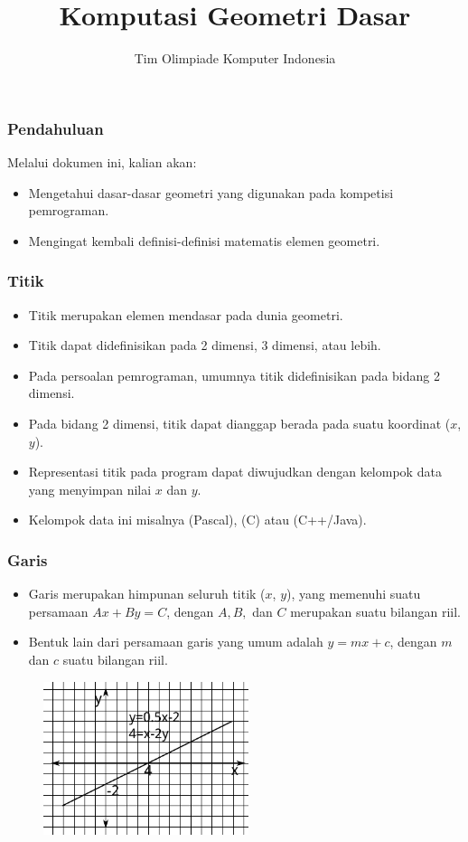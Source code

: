 

\title{Komputasi Geometri Dasar}
\author{Tim Olimpiade Komputer Indonesia}
\date{}



\begin{frame}
\titlepage
\end{frame}

\begin{frame}
\frametitle{Pendahuluan}
Melalui dokumen ini, kalian akan:
\begin{itemize}
  \item Mengetahui dasar-dasar geometri yang digunakan pada kompetisi pemrograman.
  \item Mengingat kembali definisi-definisi matematis elemen geometri.
\end{itemize}
\end{frame}

\begin{frame}
\frametitle{Titik}
\begin{itemize}
  \item Titik merupakan elemen mendasar pada dunia geometri.
  \item Titik dapat didefinisikan pada 2 dimensi, 3 dimensi, atau lebih.
  \item Pada persoalan pemrograman, umumnya titik didefinisikan pada bidang 2 dimensi.
  \item Pada bidang 2 dimensi, titik dapat dianggap berada pada suatu koordinat ($x$, $y$).
  \item Representasi titik pada program dapat diwujudkan dengan kelompok data yang menyimpan nilai $x$ dan $y$.
  \item Kelompok data ini misalnya  (Pascal),  (C) atau  (C++/Java).
\end{itemize}
\end{frame}

\begin{frame}
\frametitle{Garis}
\begin{itemize}
  \item Garis merupakan himpunan seluruh titik ($x$, $y$), yang memenuhi suatu persamaan $Ax + By = C$, dengan $A, B,$ dan $C$ merupakan suatu bilangan riil.
  \item Bentuk lain dari persamaan garis yang umum adalah $y = mx + c$, dengan $m$ dan $c$ suatu bilangan riil.
\end{itemize}  
\begin{figure}
  \includegraphics[width=6cm]{asset/line.pdf}
\end{figure}
\end{frame}

